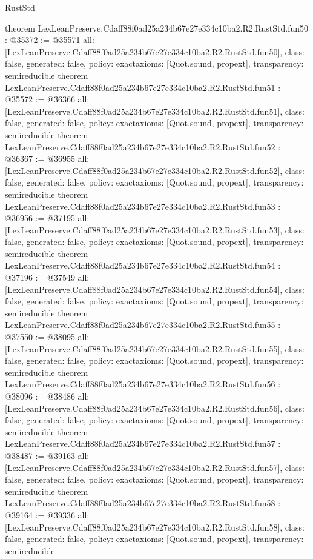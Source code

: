 \begin{lexlean}{RustStd}
\begin{coremodule}
{}
theorem LexLeanPreserve.Cdaff88f0ad25a234b67e27e334c10ba2.R2.RustStd.fun50 : @35372 := @35571 {
  all: [LexLeanPreserve.Cdaff88f0ad25a234b67e27e334c10ba2.R2.RustStd.fun50],
  class: false,
  generated: false,
  policy: exact{axioms: [Quot.sound, propext]},
  transparency: semireducible
}
theorem LexLeanPreserve.Cdaff88f0ad25a234b67e27e334c10ba2.R2.RustStd.fun51 : @35572 := @36366 {
  all: [LexLeanPreserve.Cdaff88f0ad25a234b67e27e334c10ba2.R2.RustStd.fun51],
  class: false,
  generated: false,
  policy: exact{axioms: [Quot.sound, propext]},
  transparency: semireducible
}
theorem LexLeanPreserve.Cdaff88f0ad25a234b67e27e334c10ba2.R2.RustStd.fun52 : @36367 := @36955 {
  all: [LexLeanPreserve.Cdaff88f0ad25a234b67e27e334c10ba2.R2.RustStd.fun52],
  class: false,
  generated: false,
  policy: exact{axioms: [Quot.sound, propext]},
  transparency: semireducible
}
theorem LexLeanPreserve.Cdaff88f0ad25a234b67e27e334c10ba2.R2.RustStd.fun53 : @36956 := @37195 {
  all: [LexLeanPreserve.Cdaff88f0ad25a234b67e27e334c10ba2.R2.RustStd.fun53],
  class: false,
  generated: false,
  policy: exact{axioms: [Quot.sound, propext]},
  transparency: semireducible
}
theorem LexLeanPreserve.Cdaff88f0ad25a234b67e27e334c10ba2.R2.RustStd.fun54 : @37196 := @37549 {
  all: [LexLeanPreserve.Cdaff88f0ad25a234b67e27e334c10ba2.R2.RustStd.fun54],
  class: false,
  generated: false,
  policy: exact{axioms: [Quot.sound, propext]},
  transparency: semireducible
}
theorem LexLeanPreserve.Cdaff88f0ad25a234b67e27e334c10ba2.R2.RustStd.fun55 : @37550 := @38095 {
  all: [LexLeanPreserve.Cdaff88f0ad25a234b67e27e334c10ba2.R2.RustStd.fun55],
  class: false,
  generated: false,
  policy: exact{axioms: [Quot.sound, propext]},
  transparency: semireducible
}
theorem LexLeanPreserve.Cdaff88f0ad25a234b67e27e334c10ba2.R2.RustStd.fun56 : @38096 := @38486 {
  all: [LexLeanPreserve.Cdaff88f0ad25a234b67e27e334c10ba2.R2.RustStd.fun56],
  class: false,
  generated: false,
  policy: exact{axioms: [Quot.sound, propext]},
  transparency: semireducible
}
theorem LexLeanPreserve.Cdaff88f0ad25a234b67e27e334c10ba2.R2.RustStd.fun57 : @38487 := @39163 {
  all: [LexLeanPreserve.Cdaff88f0ad25a234b67e27e334c10ba2.R2.RustStd.fun57],
  class: false,
  generated: false,
  policy: exact{axioms: [Quot.sound, propext]},
  transparency: semireducible
}
theorem LexLeanPreserve.Cdaff88f0ad25a234b67e27e334c10ba2.R2.RustStd.fun58 : @39164 := @39336 {
  all: [LexLeanPreserve.Cdaff88f0ad25a234b67e27e334c10ba2.R2.RustStd.fun58],
  class: false,
  generated: false,
  policy: exact{axioms: [Quot.sound, propext]},
  transparency: semireducible
}
\end{coremodule}
\end{lexlean}
